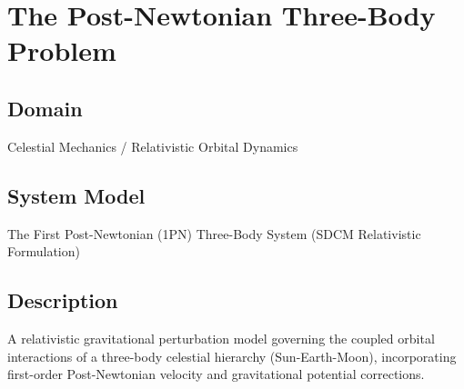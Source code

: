 \chapter{The Post-Newtonian Three-Body Problem}

\section{Domain}
Celestial Mechanics / Relativistic Orbital Dynamics

\section{System Model}
The First Post-Newtonian (1PN) Three-Body System (SDCM Relativistic Formulation)

\section{Description}
A relativistic gravitational perturbation model governing the coupled orbital interactions of a three-body celestial hierarchy (Sun-Earth-Moon), incorporating first-order Post-Newtonian velocity and gravitational potential corrections.

